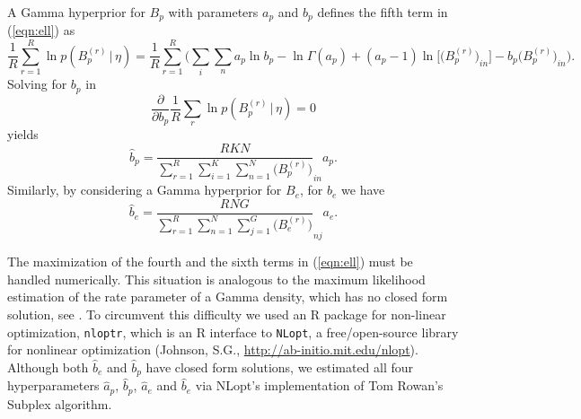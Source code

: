 \documentclass[11pt]{amsart}
\theoremstyle{definition}
\begin{document}
A Gamma hyperprior for $B_p$ with parameters $a_p$ and $b_p$ defines 
the fifth term in (\ref{eqn:ell}) as
\[
   \frac{1}{R}\sum_{r=1}^R \ln p(B_p^{(r)}\,|\, \eta)
  =
   \frac{1}{R}\sum_{r=1}^R \bigg(\sum_{i}\sum_{n} a_p\ln b_p  
    - \ln\Gamma(a_p) + 
   (a_p-1)\ln\big[\big(B_p^{(r)}\big)_{in}\big] -  
    b_p\big(B_p^{(r)}\big)_{in}\bigg).
\]
Solving for $b_p$ in 
\[
  \frac{\partial}{\partial b_p}
   \frac{1}{R}\sum_r \ln p(B_p^{(r)}\,|\, \eta) = 0
\]
yields
\[
   \hat b_p = \frac{RKN}{\sum_{r=1}^R \sum_{i=1}^K \sum_{n=1}^N 
     \big(B_p^{(r)}\big)}_{in}  a_p.
\]
Similarly, by considering a Gamma hyperprior for $B_e$, for $b_e$ we
have 
\[
   \hat b_e = \frac{RNG}{\sum_{r=1}^R \sum_{n=1}^N  \sum_{j=1}^G 
     \big(B_e^{(r)}\big)}_{nj}  a_e.
\]

The maximization of the fourth and the sixth terms in
(\ref{eqn:ell}) must be handled numerically. This situation is
analogous to the maximum likelihood estimation of the rate parameter
of a Gamma density, which has no closed form solution, see
\cite{CW}. To circumvent this difficulty we used an R package for
non-linear optimization, \texttt{nloptr}, which is an R interface to
\texttt{NLopt}, a free/open-source library for nonlinear optimization
(Johnson, S.G., \url{http://ab-initio.mit.edu/nlopt}).  Although both
$\hat b_e$ and $\hat b_p$ have closed form solutions, we estimated all
four hyperparameters $\hat a_p$, $\hat b_p$, $\hat a_e$ and $\hat b_e$
via NLopt's implementation of Tom Rowan's Subplex algorithm.
\end{document}
